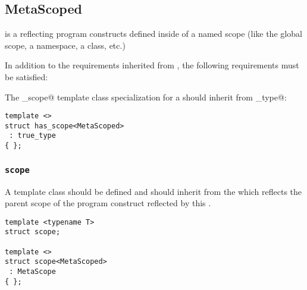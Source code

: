 \subsection{MetaScoped}
\label{concept-MetaScoped}


 is a  reflecting program constructs defined inside
of a named scope (like the global scope, a namespace, a class, etc.)

In addition to the requirements inherited from , the following requirements must
be satisfied:

The \verb@has_scope@ template class specialization for a  should
inherit from \verb@true_type@:

\begin{verbatim}
template <>
struct has_scope<MetaScoped>
 : true_type
{ };
\end{verbatim}

\subsubsection{\texttt{scope}}

A template class \verb@scope@ should be defined and should inherit from the
 which reflects the parent scope of the program construct reflected
by this .

\begin{verbatim}
template <typename T>
struct scope;

template <>
struct scope<MetaScoped>
 : MetaScope
{ };
\end{verbatim}

